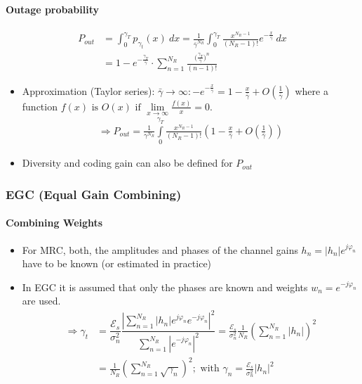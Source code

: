 \documentclass[a4paper, 10pt]{article}
\begin{document}
\paragraph{Outage probability}
\begin{align*}
	P_{out} &= \int_{0}^{\gamma _T}p_{\gamma _t}(x)~dx = \frac{1}{\bar{\gamma}^{N_R}}\int_{0}^{\gamma _T}\frac{x^{N_R-1}}{(N_R - 1)!}e^{-\frac{x}{\bar{\gamma}}}~dx \\ &= 1- e^{-\frac{\gamma _T}{\bar{\gamma}}}\cdot \sum_{n = 1}^{N_R}\frac{\bigl (\frac{\gamma _T}{\bar{\gamma}}\bigr )^n}{(n - 1)!}
\end{align*}
\begin{itemize}
	\item Approximation (Taylor series): $\bar{\gamma}\rightarrow \infty : -e^{-\frac{x}{\bar{\gamma}}} = 1 - \frac{x}{\bar{\gamma}} + O(\frac{1}{\bar{\gamma}})$\; where a function $f(x) \text{ is } O(x) \text{ if } \lim\limits_{x\to\infty}\frac{f(x)}{x} = 0$.
\begin{align*}
	\Rightarrow P_{out}=\frac{1}{\gamma^{N_R}}\int\limits_0^{\gamma_T}\frac{x^{N_R-1}}{(N_R-1)!}\left(1-\frac{x}{\bar{\gamma}}+O\left(\frac{1}{\bar{\gamma}}\right)\right)
\end{align*}
	\item Diversity and coding gain can also be defined for $P_{out}$
\end{itemize}

\subsubsection{EGC (Equal Gain Combining)}

\paragraph{Combining Weights}
\begin{itemize}
	\item For MRC, both, the amplitudes and phases of the channel gains $h_n=|h_n|e^{j\varphi_n}$ have to be known (or estimated in practice)
	\item In EGC it is assumed that only the phases are known and weights $w_n=e^{-j\varphi_n}$ are used.
\begin{align*}
	\Rightarrow \gamma_t &=\dfrac{\mathcal{E}_s}{\sigma_n^2}\dfrac{\left|\sum\limits_{n=1}^{N_R}|h_n|e^{j\varphi_n}e^{-j\varphi_n}\right|^2}{\sum\limits^{N_R}_{n=1}\left|e^{-j\varphi_n}\right|^2}
	=\frac{\mathcal{E}_s}{\sigma_n^2}\frac{1}{N_R}\left(\sum\limits^{N_R}_{n=1}|h_n|\right)^2\\
	&=\frac{1}{N_R}\left(\sum\limits_{n=1}^{N_R}\sqrt{\gamma_n}\right)^2;\text{  with  }\gamma_n=\frac{\mathcal{E}_s}{\sigma_n^2}|h_n|^2
\end{align*}
\end{itemize}
\end{document}
